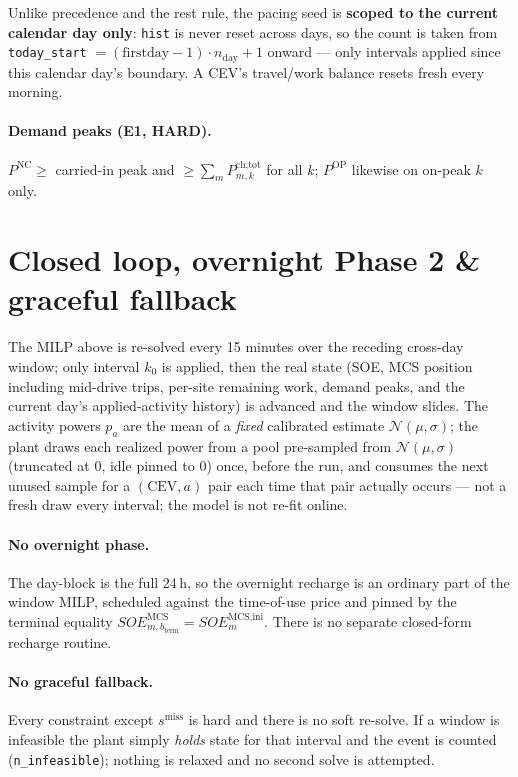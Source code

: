 \documentclass[11pt]{article}
\begin{document}
Unlike precedence and the rest rule, the pacing seed is \textbf{scoped to the current calendar day
only}: \texttt{hist} is never reset across days, so the count is taken from
\texttt{today\_start} $= (\text{firstday}-1)\cdot n_{\text{day}} + 1$ onward --- only intervals
applied since this calendar day's boundary. A CEV's travel/work balance resets fresh every
morning.

\paragraph{Demand peaks (E1, HARD).}
$P^{\text{NC}}\ge$ carried-in peak and $\ge\sum_m P^{\text{ch,tot}}_{m,k}$ for all $k$;
$P^{\text{OP}}$ likewise on on-peak $k$ only.

\section{Closed loop, overnight Phase 2 \& graceful fallback}
The MILP above is re-solved every 15 minutes over the receding cross-day window; only interval
$k_0$ is applied, then the real state (SOE, MCS position including mid-drive trips, per-site
remaining work, demand peaks, and the current day's applied-activity history) is advanced and the
window slides. The activity powers $p_a$ are the mean of a \emph{fixed} calibrated estimate
$\mathcal{N}(\mu,\sigma)$; the plant draws each realized power from a pool pre-sampled from
$\mathcal{N}(\mu,\sigma)$ (truncated at $0$, idle pinned to $0$) once, before the run, and
consumes the next unused sample for a $(\text{CEV},a)$ pair each time that pair actually occurs
--- not a fresh draw every interval; the model is not re-fit online.

\paragraph{No overnight phase.} The day-block is the full 24\,h, so the overnight recharge is an
ordinary part of the window MILP, scheduled against the time-of-use price and pinned by the
terminal equality $SOE^{\text{MCS}}_{m,b_{\text{term}}}=SOE^{\text{MCS,ini}}_m$. There is no
separate closed-form recharge routine.

\paragraph{No graceful fallback.} Every constraint except $s^{\text{miss}}$ is hard and there is no
soft re-solve. If a window is infeasible the plant simply \emph{holds} state for that interval and
the event is counted (\texttt{n\_infeasible}); nothing is relaxed and no second solve is attempted.
\end{document}
